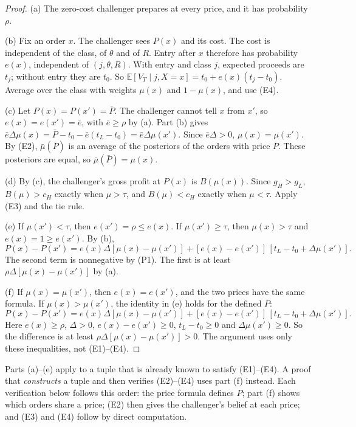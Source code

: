 \documentclass[11pt]{article}
\theoremstyle{definition}
\newcommand{\E}{\mathbb E}
\begin{document}
\begin{proof}
(a) The zero-cost challenger prepares at every price, and it has probability $\rho$.

(b) Fix an order $x$. The challenger sees $P(x)$ and its cost. The cost is independent of the class, of $\theta$
and of $R$. Entry after $x$ therefore has probability $e(x)$, independent of $(j,\theta,R)$. With entry and
class $j$, expected proceeds are $t_j$; without entry they are $t_0$. So
$\E[V_T\mid j,X=x]=t_0+e(x)(t_j-t_0)$. Average over the class with weights $\mu(x)$ and $1-\mu(x)$, and use (E4).

(c) Let $P(x)=P(x')=\bar P$. The challenger cannot tell $x$ from $x'$, so $e(x)=e(x')=\bar e$, with $\bar e\ge\rho$
by (a). Part (b) gives $\bar e\Delta\mu(x)=\bar P-t_0-\bar e(t_L-t_0)=\bar e\Delta\mu(x')$. Since
$\bar e\Delta>0$, $\mu(x)=\mu(x')$. By (E2), $\bar\mu(\bar P)$ is an average of the posteriors of the orders with
price $\bar P$. These posteriors are equal, so $\bar\mu(\bar P)=\mu(x)$.

(d) By (c), the challenger's gross profit at $P(x)$ is $B(\mu(x))$. Since $g_H>g_L$, $B(\mu)>c_H$ exactly when
$\mu>\tau$, and $B(\mu)<c_H$ exactly when $\mu<\tau$. Apply (E3) and the tie rule.

(e) If $\mu(x')<\tau$, then $e(x')=\rho\le e(x)$. If $\mu(x')\ge\tau$, then $\mu(x)>\tau$ and $e(x)=1\ge e(x')$.
By (b),
\[
P(x)-P(x')=e(x)\Delta[\mu(x)-\mu(x')]+[e(x)-e(x')]\,[t_L-t_0+\Delta\mu(x')].
\]
The second term is nonnegative by (P1). The first is at least $\rho\Delta[\mu(x)-\mu(x')]$ by (a).

(f) If $\mu(x)=\mu(x')$, then $e(x)=e(x')$, and the two prices have the same formula. If $\mu(x)>\mu(x')$, the
identity in (e) holds for the defined $P$:
\[
P(x)-P(x')=e(x)\Delta[\mu(x)-\mu(x')]+[e(x)-e(x')]\,[t_L-t_0+\Delta\mu(x')].
\]
Here $e(x)\ge\rho$, $\Delta>0$, $e(x)-e(x')\ge0$, $t_L-t_0\ge0$ and $\Delta\mu(x')\ge0$. So the difference is at
least $\rho\Delta[\mu(x)-\mu(x')]>0$. The argument uses only these inequalities, not (E1)--(E4).
\end{proof}

Parts (a)--(e) apply to a tuple that is already known to satisfy (E1)--(E4). A proof that \emph{constructs} a
tuple and then verifies (E2)--(E4) uses part (f) instead. Each verification below follows this order:
the price formula defines $P$; part (f) shows which orders share a price; (E2) then gives the challenger's
belief at each price; and (E3) and (E4) follow by direct computation.
\end{document}
